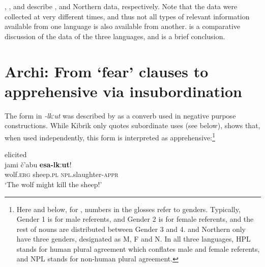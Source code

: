 \documentclass[output=paper,colorlinks,citecolor=brown]{langscibook}
\begin{document}
,  , and  describe ,  and Northern  data, respectively. Note that the data were collected at very different times, and thus not all types of relevant information available from one language is also available from another.  is a comparative discussion of the data of the three languages, and  is a brief conclusion.




\section{Archi: From `fear' clauses to apprehensive via insubordination}
\label{sec:Archi}
 
The  form in \textit{-lkːut} was described by \citet[292]{Kibrik1977} as a converb used in negative purpose constructions. While Kibrik only quotes subordinate uses (see  below), \citet{Dobrushina2006cyrillic} shows that, when used independently, this form is interpreted as apprehensive:\footnote{Here and below, for , numbers in the glosses refer to genders. Typically, Gender 1 is for male referents, and Gender 2 is for female referents, and the rest of nouns are distributed between Gender 3 and 4.  and Northern  only have three genders, designated as M, F and N. In all three languages, HPL stands for human plural agreement which conflates male and female referents, and NPL stands for non-human plural agreement.}


\ea \label{ex:DD1} \textnormal{elicited} \\
\gll jami č'abu \textbf{esa-lkːut}! \\
wolf.\textsc{erg} sheep.\textsc{pl} \textsc{npl}.slaughter-\textsc{appr} \\
\glt `The wolf might kill the sheep!' \\
\z
\end{document}
